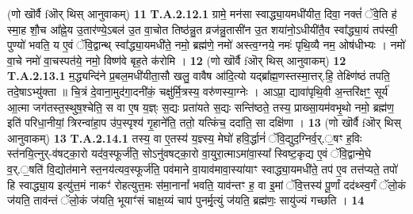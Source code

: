 \documentclass[17pt]{extarticle}
\begin{document}
                  \newline
                                                        (णो खॊर्वै fऒर् थिस् आनुवाकम्) \textbf{11} \newline \newline
                                \textbf{ T.A.2.12.1} \newline
                  ग्रामे॒ मन॑सा स्वाद्ध्या॒यमधी॑यीत॒ दिवा॒ नक्तं॑ ॅवे॒ति ह॑ स्मा॒ह शौ॒च आ᳚ह्ने॒य उ॒तार॑ण्ये॒ऽबल॑ उ॒त वा॒चोत तिष्ठ॑न्नु॒त व्रज॑न्नु॒तासी॑न उ॒त शया॑नो॒ऽधीयी॑तै॒व स्वा᳚द्ध्या॒यं तप॑स्वी॒ पुण्यो॑ भवति॒ य ए॒वं ॅवि॒द्वान्थ् स्वा᳚द्ध्या॒यमधी॑ते॒ नमो॒ ब्रह्म॑णे॒ नमो॑ अस्त्व॒ग्नये॒ नमः॑ पृथि॒व्यै नम॒ ओष॑धीभ्यः ।  नमो॑ वा॒चे नमो॑ वा॒चस्पत॑ये॒ नमो॒ विष्ण॑वे बृह॒ते क॑रोमि । \textbf{ 12} \newline
                  \newline
                                                        (णो खॊर्वै fऒर् थिस् आनुवाकम्) \textbf{12} \newline \newline
                                \textbf{ T.A.2.13.1} \newline
                  म॒द्ध्यन्दि॑ने प्र॒बल॒मधी॑यीता॒सौ खलु॒ वावैष आ॑दि॒त्यो यद्ब्रा᳚ह्म॒णस्तस्मा॒त्तर्.हि॒ तेक्ष्णि॑ष्ठं तपति॒ तदे॒षाऽभ्यु॑क्ता ॥  चि॒त्रं दे॒वाना॒मुद॑गा॒दनी॑कं॒ चक्षु॑र्मि॒त्रस्य॒ वरु॑णस्या॒ग्नेः ।  आऽप्रा॒ द्यावा॑पृथि॒वी अ॒न्तरि॑क्षꣳ॒॒ सूर्य॑ आ॒त्मा जग॑तस्त॒स्थुष॒श्चेति॒ स वा ए॒ष य॒ज्ञ्ः स॒द्यः प्रता॑यते स॒द्यः सन्ति॑ष्ठते॒ तस्य॒ प्राख्सा॒यम॑वभृ॒थो नमो॒ ब्रह्म॑ण॒ इति॑ परिधा॒नीयां॒ त्रिरन्वा॑हा॒प उ॑प॒स्पृश्य॑ गृ॒हाने॑ति॒ ततो॒ यत्किंच॒ ददा॑ति॒ सा दक्षि॑णा । \textbf{ 13} \newline
                  \newline
                                                        (णो खॊर्वै fऒर् थिस् आनुवाकम्) \textbf{13} \newline \newline
                                \textbf{ T.A.2.14.1} \newline
                  तस्य॒ वा ए॒तस्य॑ य॒ज्ञ्स्य॒ मेघो॑ हवि॒र्द्धानं॑ ॅवि॒द्युद॒ग्निर्व॒र्.॒षꣳ ह॒विः स्त॑नयि॒त्नुर्-व॑षट्का॒रो यद॑व॒स्फूर्ज॑ति॒ सोऽनु॑वषट्का॒रो वा॒युरा॒त्माऽमा॑वा॒स्या᳚ स्विष्ट॒कृद्य ए॒वं ॅवि॒द्वान्मे॒घे व॒र्.॒षति॑ वि॒द्योत॑माने स्त॒नय॑त्यव॒स्फूर्ज॑ति॒ पव॑माने वा॒याव॑मावा॒स्या॑याꣳ स्वाद्ध्या॒यमधी॑ते॒  तप॑ ए॒व तत्त॑प्यते॒ तपो॑ हि स्वाद्ध्या॒य इत्यु॑त्त॒मं नाकꣳ॑ रोहत्युत्त॒मः स॑मा॒नानां᳚ भवति॒ याव॑न्तꣳ ह॒ वा इ॒मां ॅवि॒त्तस्य॑ पू॒र्णां दद॑थ्स्व॒र्गं ॅलो॒कं ज॑यति॒ ताव॑न्तं ॅलो॒कं ज॑यति॒ भूयाꣳ॑सं चाक्ष॒य्यं चाप॑ पुनर्मृ॒त्युं ज॑यति॒ ब्रह्म॑णः॒ सायु॑ज्यं गच्छति । \textbf{ 14} \newline
\end{document}
